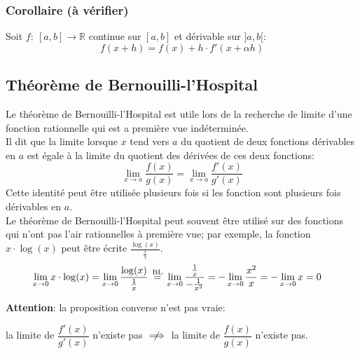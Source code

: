 \documentclass{article}
\newcommand\eqbl{\; \stackrel{ \mathclap{ \normalfont\text{BL} } }{ = } \;} %
\begin{document}
\subsubsection{Corollaire (à vérifier)}
Soit \(f : \ [a, b] \to \mathbb{R}\) continue sur \([a, b]\) et dérivable sur \(]a, b[\):
\begin{equation*}
	f(x + h) = f(x) + h \cdot f'(x + \alpha h)
\end{equation*} %

\subsection{Théorème de Bernouilli-l'Hospital}
Le théorème de Bernouilli-l'Hospital est utile lors de la recherche de limite d'une fonction rationnelle qui est a première vue indéterminée. \\

Il dit que la limite lorsque \(x\) tend vers \(a\) du quotient de deux fonctions dérivables en \(a\) est égale à la limite du quotient des dérivées de ces deux fonctions:
\begin{equation*}
	\lim_{x \to a} \dfrac{f(x)}{g(x)} = \lim_{x \to a} \dfrac{f'(x)}{g'(x)}
\end{equation*}
Cette identité peut être utilisée plusieurs fois si les fonction sont plusieurs fois dérivables en \(a\). \\

Le théorème de Bernouilli-l'Hospital peut souvent être utilisé sur des fonctions qui n'ont pas l'air rationnelles à première vue; par exemple, la fonction \(x \cdot \log(x)\) peut être écrite \(\frac{\log(x)}{\frac1x}\).
\begin{align*}
	\lim_{x \to 0} x \cdot \log(x) &= \lim_{x \to 0} \frac{\log(x)}{\frac1x} 
	\eqbl \lim_{x \to 0} \frac{\frac1x}{- \frac{1}{x^2}} 
	= - \lim_{x \to 0} \frac{x^2}{x} 
	= - \lim_{x \to 0} x = 0
\end{align*}

\textbf{Attention}: la proposition converse n'est pas vraie:
\begin{center}
	la limite de \(\dfrac{f'(x)}{g'(x)}\) n'existe pas \(\centernot\implies\) la limite de \(\dfrac{f(x)}{g(x)}\) n'existe pas.
\end{center}

\end{document}
